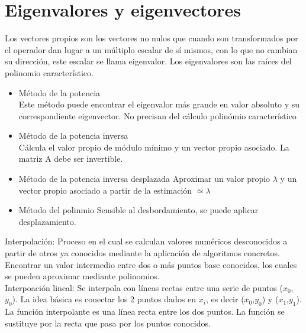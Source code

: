 \section{Eigenvalores y eigenvectores}
Los vectores propios son los vectores no nulos que cuando son transformados por el operador dan lugar a un m\'ultiplo escalar de s\'i mismos, con lo que no cambian su direcci\'on, este escalar se llama eigenvalor. Los eigenvalores son las ra\'ices del polinomio caracter\'istico.

\begin{itemize}
\item {M\'etodo de la potencia}\\
\noindent Este m\'etodo puede encontrar el eigenvalor m\'as grande en valor absoluto y su correspondiente eigenvector. No precisan del c\'alculo polin\'omio caracter\'istico

\item {M\'etodo de la potencia inversa}\\
\noindent C\'alcula el valor propio de m\'odulo m\'inimo y un vector propio asociado. La matriz A debe ser invertible.

\item {M\'etodo de la potencia inversa desplazada}
\noindent Aproximar un valor propio $\lambda$ y un vector propio asociado a partir de la estimaci\'on %
$\simeq \lambda$

\item {M\'etodo del polinmio}
\noindent Sensible al desbordamiento, se puede aplicar desplazamiento.
\end{itemize}


Interpolaci\'on: Proceso en el cual se calculan valores num\'ericos desconocidos a partir de otros ya conocidos mediante la aplicaci\'on de algoritmos concretos.\\
Encontrar un valor intermedio entre dos o m\'as puntos base conocidos, los cuales se pueden aproximar mediante polinomios.\\

Interpoaci\'on lineal: Se interpola con l\'ineas rectas entre una serie de puntos ($x_0$, $y_0$). La idea b\'asica es conectar los 2 puntos dados en $x_i$, es decir ($x_0$,$y_0$) y %
($x_1$,$y_1$). 
La funci\'on interpolante es una l\'inea recta entre los dos puntos. La funci\'on se sustituye por la recta que pasa por los puntos conocidos.\\

